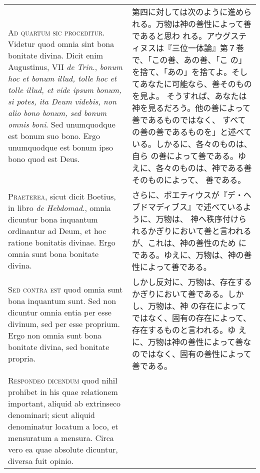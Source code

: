 \documentclass[10pt]{jsarticle} %
\begin{document}
\begin{longtable}{p{21em}p{21em}}

{\huge A}{\scshape d quartum sic proceditur}. Videtur quod omnia sint
bona bonitate divina. Dicit enim Augustinus, VII {\itshape de Trin}.,
{\itshape bonum hoc et bonum illud, tolle hoc et tolle illud, et vide
ipsum bonum, si potes, ita Deum videbis, non alio bono bonum, sed bonum
omnis boni}. Sed unumquodque est bonum suo bono. Ergo unumquodque est
bonum ipso bono quod est Deus.

&

第四に対しては次のように進められる。万物は神の善性によって善であると思わ
 れる。アウグスティヌスは『三位一体論』第７巻で、「この善、あの善、「こ
 の」を捨て、「あの」を捨てよ。そしてあなたに可能なら、善そのものを見よ。
 そうすれば、あなたは神を見るだろう。他の善によって善であるものではなく、
 すべての善の善であるものを」と述べている。しかるに、各々のものは、自ら
 の善によって善である。ゆえに、各々のものは、神である善そのものによって、
 善である。

\\

{\scshape Praeterea}, sicut dicit Boetius, in libro {\itshape de
Hebdomad}., omnia dicuntur bona inquantum ordinantur ad Deum, et hoc
ratione bonitatis divinae. Ergo omnia sunt bona bonitate divina.

&

さらに、ボエティウスが『デ・ヘブドマディブス』で述べているように、万物は、
 神へ秩序付けられるかぎりにおいて善と言われるが、これは、神の善性のため
 にである。ゆえに、万物は、神の善性によって善である。

\\

{\scshape Sed contra est} quod omnia sunt bona inquantum sunt. Sed non
dicuntur omnia entia per esse divinum, sed per esse proprium. Ergo non
omnia sunt bona bonitate divina, sed bonitate propria.

&

しかし反対に、万物は、存在するかぎりにおいて善である。しかし、万物は、神
 の存在によってではなく、固有の存在によって、存在するものと言われる。ゆ
 えに、万物は神の善性によって善なのではなく、固有の善性によって善である。


\\

{\scshape Respondeo dicendum} quod nihil prohibet in his quae relationem
 important, aliquid ab extrinseco denominari; sicut aliquid denominatur
 locatum a loco, et mensuratum a mensura.  Circa vero ea quae absolute
 dicuntur, diversa fuit opinio.


\end{longtable}
\end{document}
